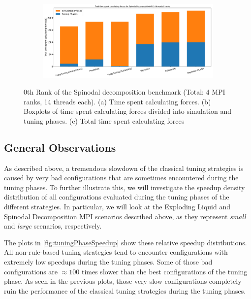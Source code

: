 \begin{figure}[H]
    \begin{subfigure}[b]{\textwidth}
        \includegraphics[width=\columnwidth,trim={0cm 0 0cm 0.9cm},clip]{figures/Benchmark/SpinodalDecompositionMPI/SpinodalDecompositionMPI_timings_total_SpinodalDecompositionMPI_14_0.png}
        \caption{}
        \label{fig:spinodalTotalTime_14thread}
    \end{subfigure}


    \caption[Spinodal decomposition benchmark MPI with 14 threads]{0th Rank of the Spinodal decomposition benchmark (Total: 4 MPI ranks, 14 threads each). (a) Time spent calculating forces. (b) Boxplots of time spent calculating forces divided into simulation and tuning phases. (c) Total time spent calculating forces}
    \label{fig:spinodal_14thread}
\end{figure}



\subsection{General Observations}

As described above, a tremendous slowdown of the classical tuning strategies is caused by very bad configurations that are sometimes encountered during the tuning phases. To further illustrate this, we will investigate the speedup density distribution of all configurations evaluated during the tuning phases of the different strategies. In particular, we will look at the Exploding Liquid and Spinodal Decomposition MPI scenarios described above, as they represent \emph{small} and \emph{large} scenarios, respectively.

The plots in \autoref{fig:tuningPhaseSpeedup} show these relative speedup distributions. All non-rule-based tuning strategies tend to encounter configurations with extremely low speedups during the tuning phases. Some of those bad configurations are $\approx100$ times slower than the best configurations of the tuning phase. As seen in the previous plots, those very slow configurations completely ruin the performance of the classical tuning strategies during the tuning phases.

